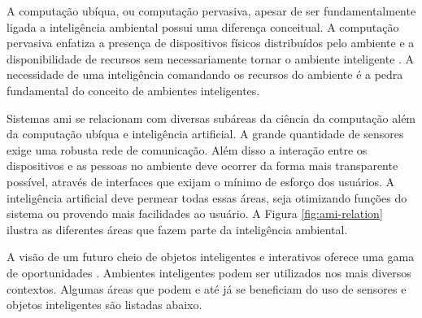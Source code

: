     
    A computação ubíqua, ou computação pervasiva, apesar de ser fundamentalmente ligada a inteligência ambiental possui uma diferença conceitual. A computação pervasiva enfatiza a presença de dispositivos físicos distribuídos pelo ambiente e a disponibilidade de recursos sem necessariamente tornar o ambiente inteligente \cite{augusto2007ambient}. A necessidade de uma inteligência comandando os recursos do ambiente é a pedra fundamental do conceito de ambientes inteligentes.
    
    
    Sistemas \acrshort{ami} se relacionam com diversas subáreas da ciência da computação além da computação ubíqua e inteligência artificial. A grande quantidade de sensores exige uma robusta rede de comunicação. Além disso a interação entre os dispositivos e as pessoas no ambiente deve ocorrer da forma mais transparente possível, através de interfaces que exijam o mínimo de esforço dos usuários. A inteligência artificial deve permear todas essas áreas, seja otimizando funções do sistema ou provendo mais facilidades ao usuário. A Figura \ref{fig:ami-relation} ilustra as diferentes áreas que fazem parte da inteligência ambiental.
    
    \begin{figure}[h!]
        \centering
    \end{figure}
    
    A visão de um futuro cheio de objetos inteligentes e interativos oferece uma gama de oportunidades \cite{bohn2005social}. Ambientes inteligentes podem ser utilizados nos mais diversos contextos. Algumas áreas que podem e até já se beneficiam do uso de sensores e objetos inteligentes são listadas abaixo.
    
